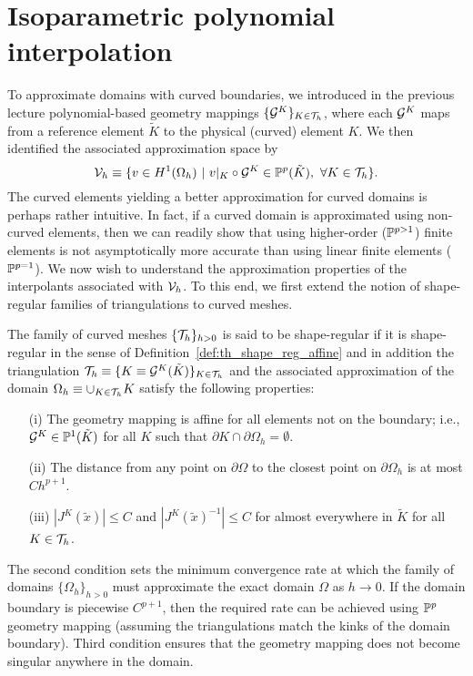 \section{Isoparametric polynomial interpolation}
To approximate domains with curved boundaries, we introduced in the previous lecture polynomial-based geometry mappings $\{\mathcal{G}^K \}_{K \in \mathcal{T}_h}$, where each $\mathcal{G}^K$ maps from a reference element $\tilde K$ to the physical (curved) element $K$. We then identified the associated approximation space by
\begin{equation*}
  \mathcal{V}_h \equiv \{ v \in H^1(\Omega_h) \ | \ v|_K \circ \mathcal{G}^K \in \mathbb{P}^p(\tilde K), \ \forall K \in \mathcal{T}_h \}.
\end{equation*}
The curved elements yielding a better approximation for curved domains is perhaps rather intuitive. In fact, if a curved domain is approximated using non-curved elements, then we can readily show that using higher-order ($\mathbb{P}^{p > 1}$) finite elements is not asymptotically more accurate than using linear finite elements ($\mathbb{P}^{p=1}$). We now wish to understand the approximation properties of the interpolants associated with $\mathcal{V}_h$.  To this end, we first extend the notion of shape-regular families of triangulations to curved meshes.

\begin{definition}
  \label{def:th_shape_reg_curved}
  The family of curved meshes $\{ \mathcal{T}_h \}_{h > 0}$ is said to be shape-regular if it is shape-regular in the sense of Definition~\ref{def:th_shape_reg_affine} and in addition the triangulation $\mathcal{T}_h \equiv \{ K \equiv \mathcal{G}^K(\tilde K) \}_{K \in \mathcal{T}_h }$ and the associated approximation of the domain $\Omega_h \equiv \cup_{K \in \mathcal{T}_h} K$ satisfy the following properties:
  \begin{itemize}
  \item[(i)] The geometry mapping is affine for all elements not on the boundary; i.e., $\mathcal{G}^K \in \mathbb{P}^1(\tilde K)$ for all $K$ such that $\partial K \cap \partial \Omega_h = \emptyset$.
  \item[(ii)] The distance from any point on $\partial \Omega$ to the closest point on $\partial \Omega_h$ is at most $C h^{p+1}$.
  \item[(iii)] $| J^K(\tilde x) | \leq C$ and $| J^K(\tilde x)^{-1} | \leq C$  for almost everywhere in $\tilde K$  for all $K \in \mathcal{T}_h$.
  \end{itemize}
\end{definition}
The second condition sets the minimum convergence rate at which the family of domains $\{ \Omega_h \}_{h > 0}$ must approximate the exact domain $\Omega$ as $h \to 0$. If the domain boundary is piecewise $C^{p+1}$, then the required rate can be achieved using $\mathbb{P}^p$ geometry mapping (assuming the triangulations match the kinks of the domain boundary). Third condition ensures that the geometry mapping does not become singular anywhere in the domain.

